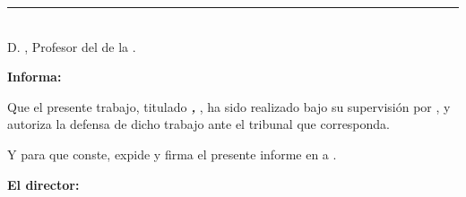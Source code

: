 \noindent\rule[-1ex]{\textwidth}{2pt}\\[4.5ex]

D. \textbf{\myProf}, Profesor del \myDepartment de la \myUni.

\vspace{0.5cm}

\textbf{Informa:}

\vspace{0.5cm}

Que el presente trabajo, titulado \textit{\textbf{\myTitle, \mySubtitle}}, ha sido realizado bajo su supervisión por \textbf{\myName}, y autoriza la defensa de dicho trabajo ante el tribunal que corresponda.

\vspace{0.5cm}

Y para que conste, expide y firma el presente informe en \myLocation a \myTime.

\vspace{1cm}

\textbf{El director:}

\vspace{5cm}

\noindent \textbf{\myProf}


\dedication{A mi historiadora del arte}
